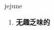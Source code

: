 
\begin{frame}
{\huge jejune}
\begin{center}
\begin{enumerate}\Large
  \item \textbf{无趣乏味的}
\end{enumerate}
\end{center}
\end{frame}

